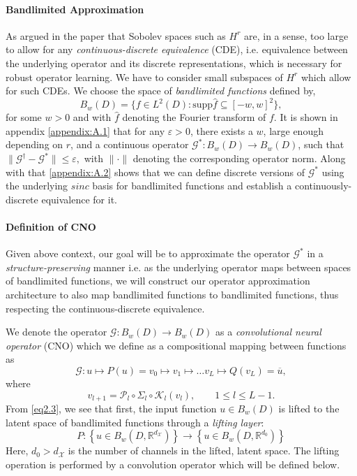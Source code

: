 \documentclass[reqno,10pt]{amsart}
\theoremstyle{plain}
\theoremstyle{definition}
\newcommand{\bb}[1]{\mathbb{#1}}
\newcommand{\cal}[1]{\mathcal{#1}}
\begin{document}
    \paragraph{\bf Bandlimited Approximation} As argued in the paper \cite{FB2023} that Sobolev spaces such as $H^r$ are, in a sense, too large to allow for any {\it continuous-discrete equivalence} (CDE), i.e. equivalence between the underlying operator and its discrete representations, which is necessary for robust operator learning. We have to consider small subspaces of $H^r$ which allow for such CDEs. We choose the space of {\it bandlimited functions} defined by,
    \begin{equation}
        B_w(D) = \{f \in L^2(D) : \text{supp}\hat{f} \subseteq [-w,w]^2\},
    \end{equation}
    for some $w > 0$ and with $\hat{f}$ denoting the Fourier transform of $f$. It is shown in appendix \ref{appendix:A.1} that for any $\varepsilon > 0$, there exists a $w$, large enough depending on $r$, and a continuous operator $\cal G^* : B_w(D) \to B_w(D)$, such that $\|\cal G^\dag - \cal G^*\| \leq \varepsilon,$ with $\|\cdot\|$ denoting the corresponding operator norm. Along with that \ref{appendix:A.2} shows that we can define discrete versions of $\cal G^*$ using the underlying $sinc$ basis for bandlimited functions and establish a continuously-discrete equivalence for it.

    \paragraph{\bf Definition of CNO} \label{def:CNO} Given above context, our goal will be to approximate the operator $\cal G^*$ in a {\it structure-preserving} manner i.e. as the underlying operator maps between spaces of bandlimited functions, we will construct our operator approximation architecture to also map bandlimited functions to bandlimited functions, thus respecting the continuous-discrete equivalence.

    \noindent We denote the operator $\cal G : B_w(D) \to B_w(D)$ as a {\it convolutional neural operator} (CNO) which we define as a compositional mapping between functions as
    \begin{equation}\label{eq2.3}
        \cal G : u \mapsto P(u) = v_0 \mapsto v_1 \mapsto \dots v_L \mapsto Q(v_L) = \overline{u},
    \end{equation}
    where
    \begin{equation}
        v_{l+1} = \cal P_l \circ \Sigma_l \circ \cal K_l(v_l), \qquad 1 \leq l \leq L - 1.
    \end{equation}
    From \ref{eq2.3}, we see that first, the input function $u \in B_w(D)$ is lifted to the latent space of bandlimited functions through a {\it lifting layer}: 
    $$ P : \left\{u \in B_w(D,\bb R^{d_{\cal X}}) \right\} \to \left\{u \in B_w(D,\bb R^{d_0}) \right\}$$ 
    Here, $d_0 > d_{\cal X}$ is the number of channels in the lifted, latent space. The lifting operation is performed by a convolution operator which will be defined below.
\end{document}
